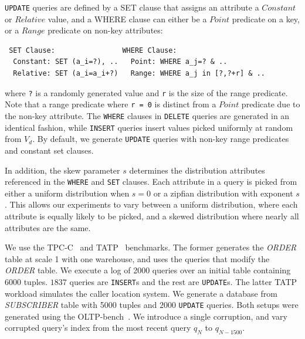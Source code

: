 \noindent \texttt{UPDATE} queries are defined by a SET clause that assigns an attribute a $Constant$ or $Relative$ value,
and a WHERE clause can either be a $Point$ predicate on a key, or a $Range$ predicate on non-key attributes:
{\scriptsize
\begin{verbatim}
 SET Clause:                WHERE Clause:
  Constant: SET (a_i=?), ..   Point: WHERE a_j=? & ..
  Relative: SET (a_i=a_i+?)   Range: WHERE a_j in [?,?+r] & ..\end{verbatim} }
where \verb|?| is a randomly generated value and \verb|r| is the size of the range predicate. 
Note that a range predicate where \texttt{r = 0} is distinct from a $Point$ predicate due to the non-key attribute.
The \texttt{WHERE} clauses in \texttt{DELETE} queries are generated in an identical fashion, while
\texttt{INSERT} queries insert values picked uniformly at random from $V_d$.
By default, we generate \texttt{UPDATE} queries with non-key range predicates and constant set clauses.

% 

In addition, the skew parameter $s$ determines the distribution attributes referenced in the \texttt{WHERE} and \texttt{SET} clauses.  
Each attribute in a query is picked from either a uniform distribution when $s=0$ or a zipfian distribution with exponent $s$.
This allows our experiments to vary between a uniform distribution, where each attribute is
equally likely to be picked, and a skewed distribution where nearly all attributes are the same. 

 We use the TPC-C~\cite{tpcc} and TATP~\cite{tatp} benchmarks.
The former generates the {\it ORDER} table at scale 1 with one warehouse, and uses the queries that modify the {\it ORDER} table. 
We execute a log of 2000 queries over an initial table containing 6000 tuples.  
$1837$ queries are \texttt{INSERT}s and the rest are \texttt{UPDATE}s. 
The latter TATP workload simulates the caller location system. 
We generate a database from {\it SUBSCRIBER} table with 5000 tuples and $2000$ \texttt{UPDATE} queries.
Both setups were generated using the OLTP-bench~\cite{difallah2013oltp}. 
We introduce a single corruption, and vary corrupted query's index from the most recent query $q_N$ to $q_{N-1500}$.



